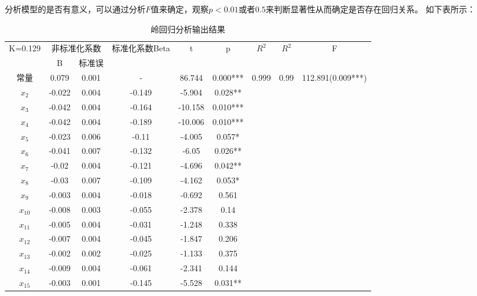 \documentclass[UTF8]{ctexart}
\begin{document}
分析模型的是否有意义，可以通过分析$F$值来确定，观察$p<0.01$或者$0.5$来判断显著性从而确定是否存在回归关系。 	
如下表所示：
\begin{table}[H]
    \centering
	\caption{岭回归分析输出结果}
    \begin{tabular}{|c|c|c|c|c|c|c|c|c|}
    \hline
	\multirow{2}{*}{K=0.129} & \multicolumn{2}{|c|}{非标准化系数} & \multirow{2}{*}{标准化系数Beta} & \multirow{2}{*}{t} & \multirow{2}{*}{p} & \multirow{2}{*}{$R^{2}$} & \multirow{2}{*}{\text{调整}$R^{2}$} & \multirow{2}{*}{F} \\ \cline{2-3}
        ~ & B & 标准误 & ~ & ~ & ~ & ~ & ~ & ~ \\ \hline
        常量 & 0.079 & 0.001 & - & 86.744 & 0.000*** & \multirow{15}{*}{0.999} & \multirow{15}{*}{0.99} & \multirow{15}{*}{112.891(0.009***)} \\ \cline{1-6}
		$x_{2}$ & -0.022 & 0.004 & -0.149 & -5.904 & 0.028** & ~ & ~ & ~ \\ \cline{1-6}
        $x_{3}$ & -0.042 & 0.004 & -0.164 & -10.158 & 0.010*** & ~ & ~ & ~ \\ \cline{1-6}
        $x_{4}$ & -0.042 & 0.004 & -0.189 & -10.006 & 0.010*** & ~ & ~ & ~ \\ \cline{1-6}
        $x_{5}$ & -0.023 & 0.006 & -0.11 & -4.005 & 0.057* & ~ & ~ & ~ \\ \cline{1-6}
		$x_{6}$ & -0.041 & 0.007 & -0.132 & -6.05 & 0.026** & ~ & ~ & ~ \\ \cline{1-6}
        $x_{7}$ & -0.02 & 0.004 & -0.121 & -4.696 & 0.042** & ~ & ~ & ~ \\ \cline{1-6}
        $x_{8}$ & -0.03 & 0.007 & -0.109 & -4.162 & 0.053* & ~ & ~ & ~ \\ \cline{1-6}
        $x_{9}$ & -0.003 & 0.004 & -0.018 & -0.692 & 0.561 & ~ & ~ & ~ \\ \cline{1-6}
        $x_{10}$ & -0.008 & 0.003 & -0.055 & -2.378 & 0.14 & ~ & ~ & ~ \\ \cline{1-6}
        $x_{11}$ & -0.005 & 0.004 & -0.031 & -1.248 & 0.338 & ~ & ~ & ~ \\ \cline{1-6}
        $x_{12}$ & -0.007 & 0.004 & -0.045 & -1.847 & 0.206 & ~ & ~ & ~ \\ \cline{1-6}
        $x_{13}$ & -0.002 & 0.002 & -0.025 & -1.133 & 0.375 & ~ & ~ & ~ \\ \cline{1-6}
        $x_{14}$ & -0.009 & 0.004 & -0.061 & -2.341 & 0.144 & ~ & ~ & ~ \\ \cline{1-6}
        $x_{15}$ & -0.003 & 0.001 & -0.145 & -5.528 & 0.031** & ~ & ~ & ~ \\ \hline
    \end{tabular}
\end{table}
\end{document}
